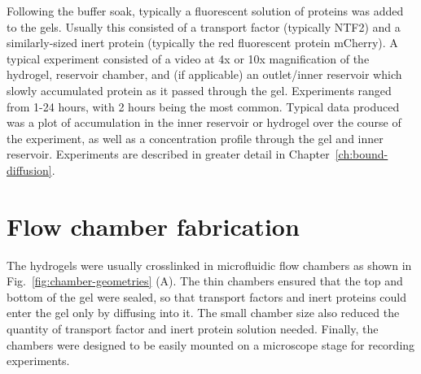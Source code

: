 Following the buffer soak, typically a fluorescent solution of proteins was added to the gels.  Usually this consisted of a transport factor (typically NTF2) and a similarly-sized inert protein (typically the red fluorescent protein mCherry).  A typical experiment consisted of a video at 4x or 10x magnification of the hydrogel, reservoir chamber, and (if applicable) an outlet/inner reservoir which slowly accumulated protein as it passed through the gel.  Experiments ranged from 1-24 hours, with 2 hours being the most common.  Typical data produced was a plot of accumulation in the inner reservoir or hydrogel over the course of the experiment, as well as a concentration profile through the gel and inner reservoir.  Experiments are described in greater detail in Chapter~\ref{ch:bound-diffusion}.






\section{Flow chamber fabrication}
\label{sec:flow-chambers}

The hydrogels were usually crosslinked in microfluidic flow chambers as shown in Fig.~\ref{fig:chamber-geometries} (A).  The thin chambers ensured that the top and bottom of the gel were sealed, so that transport factors and inert proteins could enter the gel only by diffusing into it.  The small chamber size also reduced the quantity of transport factor and inert protein solution needed.  Finally, the chambers were designed to be easily mounted on a microscope stage for recording experiments.

